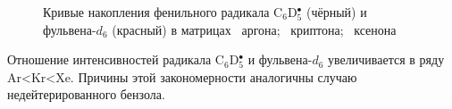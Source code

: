 {\begin{figure}[H]  
\vspace{-4ex} \centering {}  
\hspace{4ex}
\hspace{4ex}
\caption{Кривые накопления фенильного радикала C$_6$D$_5^\bullet$ (чёрный) и фульвена-$d_6$ (красный) в матрицах ~аргона; ~криптона; ~ксенона} \label{tio-d}
\end{figure}

 Отношение интенсивностей радикала C$_6$D$_5^\bullet$ и фульвена-$d_6$ увеличивается в ряду Ar<Kr<Xe. Причины этой закономерности аналогичны случаю недейтерированного бензола.

}

